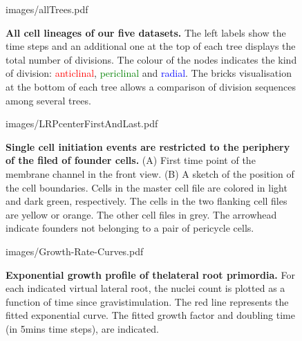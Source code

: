 \documentclass[11pt,a4paper, draft]{article}
\begin{document}
\clearpage
%
%
\begin{figure}[htbp]
	\begin{center}
		\begin{overpic}[width=1.\linewidth]{images/allTrees.pdf}
		\end{overpic}
\caption[All cell lineages of our five datasets.]
{
{\bf All cell lineages of our five datasets.} The left labels show the time steps and an additional one at the top of each tree displays the total number of divisions. The colour of the nodes indicates the kind of division: \textcolor{red}{anticlinal}, \textcolor{green}{periclinal} and \textcolor{blue}{radial}. The bricks visualisation at the bottom of each tree allows a comparison of division sequences among several trees.
}
	\label{fig:allTrees}
	\end{center}
\end{figure}
\clearpage
%
\begin{figure}[htbp]
	\begin{center}
	\begin{overpic}[width=0.5\linewidth]{images/LRPcenterFirstAndLast.pdf}
	\end{overpic}
\caption[Single cell initiation events are restricted to the periphery of the filed of founder cells.]
{{\bf Single cell initiation events are restricted to the periphery of the filed of founder cells.} (A) First time point of the membrane channel in the front view. (B) A sketch of the position of the cell boundaries. Cells in the master cell file are colored in light and dark green, respectively. The cells in the two flanking cell files are yellow or orange. The other cell files in grey. The arrowhead indicate founders not belonging to a pair of pericycle cells.}
	\label{fig:founderstop}
	\end{center}
\end{figure}
%
\clearpage
%
%
\begin{figure}[htbp]
	\begin{center}
	\begin{overpic}[width=1.\linewidth]{images/Growth-Rate-Curves.pdf}
	\end{overpic}
\caption[Exponential growth profile of the lateral root primordia.]
{{\bf Exponential growth profile of thelateral root primordia.} For each indicated virtual lateral root, the nuclei count  is plotted as a function of time since gravistimulation. The red line represents the fitted exponential curve. The fitted growth factor and doubling time (in 5mins time steps), are indicated.}
	\label{fig:growthcurves}
	\end{center}
\end{figure}
\end{document}
